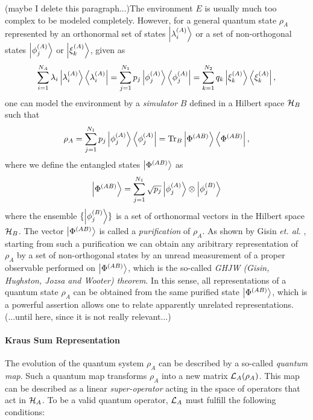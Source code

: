\smallskip

(maybe I delete this paragraph...)The environment $E$ is usually much too complex to be modeled completely. However, for a general quantum state $\rho_A$ represented by an orthonormal set of states $\left| \lambda_i^{(A)} \right>$ or a set of non-orthogonal states $\left| \phi_j^{(A)} \right>$ or $\left| \xi_k^{(A)} \right>$, given as 
%
\begin{equation}
\sum\limits_{i=1}^{N_A}\lambda_i\left| \lambda_i^{(A)} \right>\left< \lambda_i^{(A)} \right| = \sum\limits_{j=1}^{N_1}p_j\left| \phi_j^{(A)} \right>\left< \phi_j^{(A)} \right| = \sum\limits_{k=1}^{N_2}q_k\left| \xi_k^{(A)} \right>\left< \xi_k^{(A)} \right|,
\end{equation}
%
one can model the environment by a {\it simulator} $B$ defined in a Hilbert space $\begin{mathcal}H\end{mathcal}_B$ such that
%
\begin{equation}
\rho_A = \sum\limits_{j=1}^{N_1}p_j\left| \phi_j^{(A)} \right>\left< \phi_j^{(A)} \right| = \mathrm{Tr}_B \left| \Phi^{(AB)} \right>\left< \Phi^{(AB)} \right|,
\end{equation}
%
where we define the entangled states $\left| \Phi^{(AB)} \right>$ as
%
\begin{equation}
\left| \Phi^{(AB)} \right> = \sum\limits_{j=1}^{N_1}\sqrt{p_j}\left| \phi_j^{(A)} \right>\otimes\left| \phi_j^{(B)} \right>
\end{equation}
%
where the ensemble $\{\left| \phi_j^{(B)} \right>\}$ is a set of orthonormal vectors in the Hilbert space $\begin{mathcal}H\end{mathcal}_B$. The vector $\left| \Phi^{(AB)} \right>$ is called a {\it purification} of $\rho_A$. As shown by Gisin {\it et. al.} \citep{gisin_stochastic_1989,hughston_complete_1993}, starting from such a purification we can obtain any aribitrary representation of $\rho_A$ by a set of non-orthogonal states by an unread measurement of a proper observable performed on $\left| \Phi^{(AB)} \right>$, which is the so-called {\it GHJW (Gisin, Hughston, Jozsa and Wooter) theorem}. In this sense, all representations of a quantum state $\rho_A$ can be obtained from the same purified state $\left| \Phi^{(AB)} \right>$, which is a powerful assertion allows one to relate apparently unrelated representations. (...until here, since it is not really relevant...)

\smallskip

\paragraph{Kraus Sum Representation} The evolution of the quantum system $\rho_A$ can be described by a so-called {\it quantum map}. Such a quantum map transforms $\rho_A$ into a new matrix $\LA{A}(\rho_A)$. This map can be described as a linear {\it super-operator} acting in the space of operators that act in $\begin{mathcal}H\end{mathcal}_A$. To be a valid quantum operator, $\begin{mathcal}L\end{mathcal}_A$ must fulfill the following conditions:


